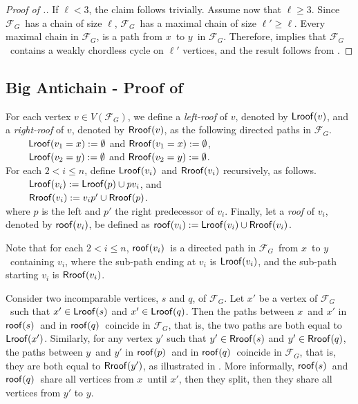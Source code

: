 \documentclass[lotsofwhite,charterfonts, letter]{patmorin}
\newcommand{\fg}{\ensuremath{\mathcal{F}_G}}
\newcommand{\xx}{\ensuremath{x}}
\newcommand{\yy}{\ensuremath{y}}
\newcommand{\rf}[1]{\ensuremath{\textup{\textsf{roof}}(#1)}}
\newcommand{\lrf}[1]{\ensuremath{\textup{\textsf{Lroof}}(#1)}}
\newcommand{\rrf}[1]{\ensuremath{\textup{\textsf{Rroof}}(#1)}}
\begin{document}
\begin{proof}[Proof of .]
If $\ell<3$, the claim follows trivially. Assume now that $\ell\geq
3$. Since \fg\ has a chain of size $\ell$, \fg\ has a maximal chain of
size $\ell'\geq \ell$. Every maximal chain in \fg, is a path from \xx\
to \yy\ in \fg. Therefore,  implies that \fg\ contains
a weakly chordless cycle on $\ell'$ vertices, and the result follows
from \thmref{alex}.
\end{proof}



\subsection{Big Antichain - Proof of }
For each vertex $v\in V(\fg)$, we define a \emph{left-roof} of $v$, denoted by \lrf{v}, and a \emph{right-roof} of $v$, denoted by \rrf{v}, as the following directed paths in \fg. \\
$~~~~~~~~~$ $\lrf{v_1=\xx}:=\emptyset$ and $\rrf{v_1=\xx}:=\emptyset$,\\
$~~~~~~~~~$ $\lrf{v_2=\yy}:=\emptyset$ and $\rrf{v_2=\yy}:=\emptyset$.\\
For each $2< i\leq n$, define \lrf{v_i}\ and \rrf{v_i} recursively, as follows.\\
$~~~~~~~~~$ $\lrf{v_i}:=\lrf{p}\cup{pv_i}$, and \\
$~~~~~~~~~$ $\rrf{v_i}:=v_ip'\cup \rrf{p}$. \\
where $p$ is the left and $p'$ the right predecessor of $v_i$. Finally, let a \emph{roof} of $v_i$, denoted by \rf{v_i}, be defined as $\rf{v_i}:=\lrf{v_i}\cup\rrf{v_i}$.

Note that for each $2<i\leq n$, \rf{v_i}\ is a directed path in \fg\ from \xx\ to \yy\ containing $v_i$, where the sub-path ending at $v_i$ is \lrf{v_i}, and the sub-path starting $v_i$ is \rrf{v_i}.

%
%


Consider two incomparable vertices, $s$ and $q$, of \fg. Let $\xx'$ be
a vertex of \fg\ such that $\xx'\in\lrf{s}$ and $\xx'\in\lrf{q}$. Then
the paths between \xx\ and $\xx'$ in \rf{s}\ and in \rf{q}\ coincide
in \fg, that is, the two paths are both equal to \lrf{\xx'}.
Similarly, for any vertex $\yy'$ such that $\yy'\in\rrf{s}$ and
$\yy'\in\rrf{q}$, the paths between \yy\ and $\yy'$ in \rf{p}\ and in
\rf{q}\ coincide in \fg, that is, they are both equal to \rrf{\yy'},
as illustrated in \figref{}. More informally, \rf{s}\ and \rf{q}\
share all vertices from \xx\ until $\xx'$, then they split, then they
share all vertices from $\yy'$ to \yy.
\end{document}
